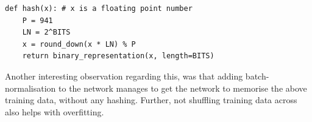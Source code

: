 \documentclass{ociamthesis}
\begin{document}
\lstset{language=Python}
\lstset{frame=lines}
 
\lstset{basicstyle=\footnotesize}
\begin{lstlisting}
def hash(x): # x is a floating point number
    P = 941
    LN = 2^BITS
    x = round_down(x * LN) % P
    return binary_representation(x, length=BITS) 
\end{lstlisting}
Another interesting observation regarding this, was that adding
batch-normalisation \citep{batch-norm} to the network manages to get the network
to memorise the above training data, without any hashing. Further, not shuffling
training data across also helps with overfitting.
\end{document}
